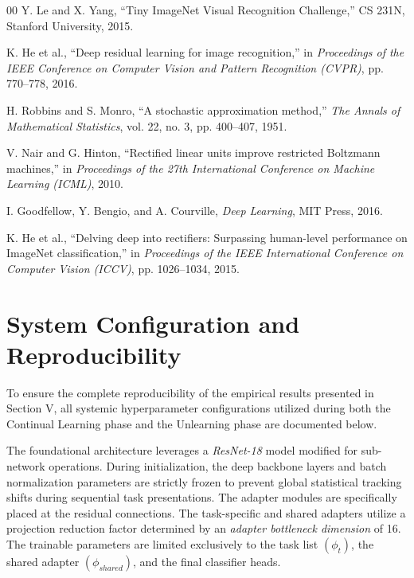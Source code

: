 \documentclass[conference]{IEEEtran}
\theoremstyle{plain}
\theoremstyle{definition}
\theoremstyle{remark}
\begin{document}
\begin{thebibliography}{00}
Y. Le and X. Yang, ``Tiny ImageNet Visual Recognition Challenge,'' CS 231N, Stanford University, 2015.

K. He et al., ``Deep residual learning for image recognition,'' in \textit{Proceedings of the IEEE Conference on Computer Vision and Pattern Recognition (CVPR)}, pp. 770--778, 2016.

H. Robbins and S. Monro, ``A stochastic approximation method,'' \textit{The Annals of Mathematical Statistics}, vol. 22, no. 3, pp. 400--407, 1951.

V. Nair and G. Hinton, ``Rectified linear units improve restricted Boltzmann machines,'' in \textit{Proceedings of the 27th International Conference on Machine Learning (ICML)}, 2010.

I. Goodfellow, Y. Bengio, and A. Courville, \textit{Deep Learning}, MIT Press, 2016.

K. He et al., ``Delving deep into rectifiers: Surpassing human-level performance on ImageNet classification,'' in \textit{Proceedings of the IEEE International Conference on Computer Vision (ICCV)}, pp. 1026--1034, 2015.

\end{thebibliography}

\clearpage

\appendices

\section{System Configuration and Reproducibility}
To ensure the complete reproducibility of the empirical results presented in Section V, all systemic hyperparameter configurations utilized during both the Continual Learning phase and the Unlearning phase are documented below.

The foundational architecture leverages a \textit{ResNet-18} model modified for sub-network operations. During initialization, the deep backbone layers and batch normalization parameters are strictly frozen to prevent global statistical tracking shifts during sequential task presentations. The adapter modules are specifically placed at the residual connections. The task-specific and shared adapters utilize a projection reduction factor determined by an \textit{adapter bottleneck dimension} of 16. The trainable parameters are limited exclusively to the task list \((\phi_{t})\), the shared adapter \((\phi_{shared})\), and the final classifier heads.
\end{document}
